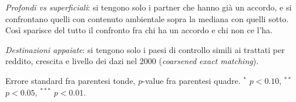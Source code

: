 \begin{table}[htbp]
\begin{threeparttable}
\begin{tablenotes}[flushleft]
\item \textit{Profondi vs superficiali}: si tengono solo i partner che hanno gi\`a un accordo, e si confrontano quelli con contenuto ambientale sopra la mediana con quelli sotto. Cos\`i sparisce del tutto il confronto fra chi ha un accordo e chi non ce l'ha.
\item \textit{Destinazioni appaiate}: si tengono solo i paesi di controllo simili ai trattati per reddito, crescita e livello dei dazi nel 2000 (\emph{coarsened exact matching}).
\item Errore standard fra parentesi tonde, $p$-value fra parentesi quadre. $^{*}$ $p<0.10$, $^{**}$ $p<0.05$, $^{***}$ $p<0.01$.
\end{tablenotes}
\end{threeparttable}
\end{table}
